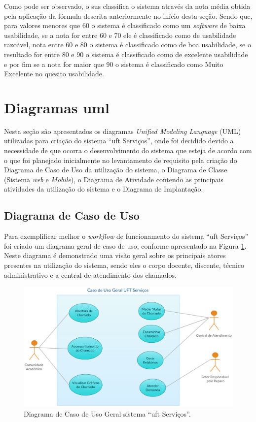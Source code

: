 Como pode ser observado, o \acrshort{sus} classifica o sistema através da nota média obtida pela aplicação da fórmula descrita anteriormente no início desta seção. Sendo que, para valores menores que 60 o sistema é classificado como um \textit{software} de baixa usabilidade, se a nota for entre 60 e 70 ele é classificado como de usabilidade razoável, nota entre 60 e 80 o sistema é classificado como de boa usabilidade, se o resultado for entre 80 e 90 o sistema é classificado como de excelente usabilidade e por fim se a nota for maior que 90 o sistema é classificado como Muito Excelente no quesito usabilidade.

\section{Diagramas \acrshort{uml}}

\noindent Nesta seção são apresentados os diagramas \textit{Unified Modeling Language} (UML) utilizadas para criação do sistema ``\acrshort{uft} Serviços'', onde foi decidido devido a necessidade de que ocorra o desenvolvimento do sistema que esteja de acordo com o que foi planejado inicialmente no levantamento de requisito pela criação do Diagrama de Caso de Uso da utilização do sistema, o Diagrama de Classe (Sistema \textit{web} e \textit{Mobile}), o Diagrama de Atividade contendo as principais atividades da utilização do sistema e o Diagrama de Implantação.

\subsection*{Diagrama de Caso de Uso}

Para exemplificar melhor o \textit{workflow} de funcionamento do sistema ``\acrshort{uft} Serviços'' foi criado um diagrama geral de caso de uso, conforme apresentado na Figura \ref{diagram-uml-casodeuso}. Neste diagrama é demonstrado uma visão geral sobre os principais atores presentes na utilização do sistema, sendo eles o corpo docente, discente, técnico administrativo e a central de atendimento dos chamados.

\begin{figure}[H]
 \centering
 \includegraphics[width=1\textwidth]{figuras/uml-casodeuso.eps} 
 \caption{Diagrama de Caso de Uso Geral sistema ``\acrshort{uft} Serviços''.}
 \label{diagram-uml-casodeuso} 
\end{figure}

